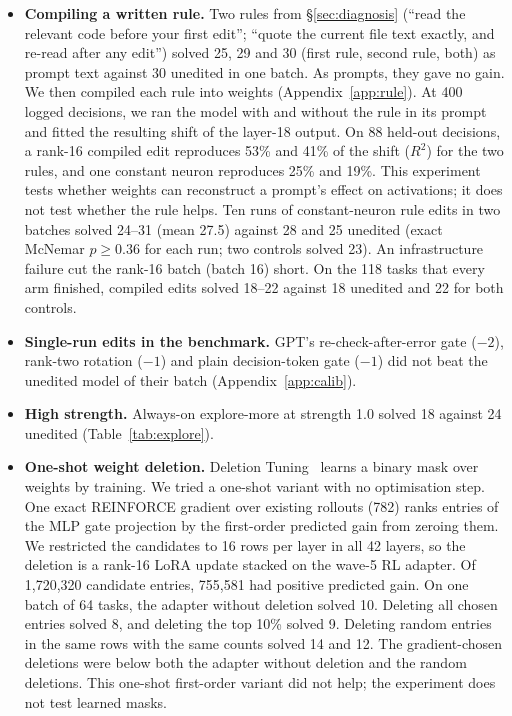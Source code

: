\begin{itemize}
    \item \textbf{Compiling a written rule.} Two rules from \S\ref{sec:diagnosis} (``read the relevant code before your first edit''; ``quote the current file text exactly, and re-read after any edit'') solved 25, 29 and 30 (first rule, second rule, both) as prompt text against 30 unedited in one batch. As prompts, they gave no gain. We then compiled each rule into weights (Appendix~\ref{app:rule}). At 400 logged decisions, we ran the model with and without the rule in its prompt and fitted the resulting shift of the layer-18 output. On 88 held-out decisions, a rank-16 compiled edit reproduces 53\% and 41\% of the shift ($R^2$) for the two rules, and one constant neuron reproduces 25\% and 19\%. This experiment tests whether weights can reconstruct a prompt's effect on activations; it does not test whether the rule helps. Ten runs of constant-neuron rule edits in two batches solved 24--31 (mean 27.5) against 28 and 25 unedited (exact McNemar $p \geq 0.36$ for each run; two controls solved 23). An infrastructure failure cut the rank-16 batch (batch 16) short. On the 118 tasks that every arm finished, compiled edits solved 18--22 against 18 unedited and 22 for both controls.
    \item \textbf{Single-run edits in the benchmark.} GPT's re-check-after-error gate ($-2$), rank-two rotation ($-1$) and plain decision-token gate ($-1$) did not beat the unedited model of their batch (Appendix~\ref{app:calib}).
    \item \textbf{High strength.} Always-on explore-more at strength 1.0 solved 18 against 24 unedited (Table~\ref{tab:explore}).
    \item \textbf{One-shot weight deletion.} Deletion Tuning~\citep{Lu2026SurprisingEffectiveness} learns a binary mask over weights by training. We tried a one-shot variant with no optimisation step. One exact REINFORCE gradient over existing rollouts (782) ranks entries of the MLP gate projection by the first-order predicted gain from zeroing them. We restricted the candidates to 16 rows per layer in all 42 layers, so the deletion is a rank-16 LoRA update stacked on the wave-5 RL adapter. Of 1,720,320 candidate entries, 755,581 had positive predicted gain. On one batch of 64 tasks, the adapter without deletion solved 10. Deleting all chosen entries solved 8, and deleting the top 10\% solved 9. Deleting random entries in the same rows with the same counts solved 14 and 12. The gradient-chosen deletions were below both the adapter without deletion and the random deletions. This one-shot first-order variant did not help; the experiment does not test learned masks.
\end{itemize}

